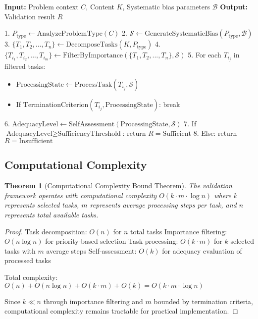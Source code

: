 \documentclass[12pt,a4paper]{article}
\newtheorem{theorem}{Theorem}
\begin{document}
\begin{algorithm}
\textbf{Input:} Problem context $C$, Content $K$, Systematic bias parameters $\mathcal{B}$
\textbf{Output:} Validation result $R$

1. $P_{\text{type}} \leftarrow \text{AnalyzeProblemType}(C)$
2. $\mathcal{S} \leftarrow \text{GenerateSystematicBias}(P_{\text{type}}, \mathcal{B})$
3. $\{T_1, T_2, ..., T_n\} \leftarrow \text{DecomposeTasks}(K, P_{\text{type}})$
4. $\{T_{i_1}, T_{i_2}, ..., T_{i_m}\} \leftarrow \text{FilterByImportance}(\{T_1, T_2, ..., T_n\}, \mathcal{S})$
5. For each $T_{i_j}$ in filtered tasks:
   \begin{itemize}
   \item $\text{ProcessingState} \leftarrow \text{ProcessTask}(T_{i_j}, \mathcal{S})$
   \item If $\text{TerminationCriterion}(T_{i_j}, \text{ProcessingState})$: break
   \end{itemize}
6. $\text{AdequacyLevel} \leftarrow \text{SelfAssessment}(\text{ProcessingState}, \mathcal{S})$
7. If $\text{AdequacyLevel} \geq \text{SufficiencyThreshold}$: return $R = \text{Sufficient}$
8. Else: return $R = \text{Insufficient}$
\end{algorithm}

\subsection{Computational Complexity}

\begin{theorem}[Computational Complexity Bound Theorem]
The validation framework operates with computational complexity $O(k \cdot m \cdot \log n)$ where $k$ represents selected tasks, $m$ represents average processing steps per task, and $n$ represents total available tasks.
\end{theorem}

\begin{proof}
Task decomposition: $O(n)$ for $n$ total tasks
Importance filtering: $O(n \log n)$ for priority-based selection
Task processing: $O(k \cdot m)$ for $k$ selected tasks with $m$ average steps
Self-assessment: $O(k)$ for adequacy evaluation of processed tasks

Total complexity: $O(n) + O(n \log n) + O(k \cdot m) + O(k) = O(k \cdot m \cdot \log n)$

Since $k \ll n$ through importance filtering and $m$ bounded by termination criteria, computational complexity remains tractable for practical implementation.
\end{proof}
\end{document}
